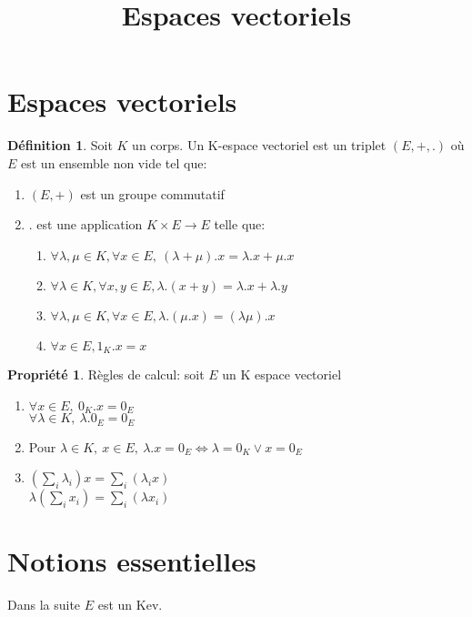 \documentclass[fleqn]{article}
\title{Espaces vectoriels}
\date{}
\theoremstyle{definition} \newtheorem*{defi}{D\'efinition}
\theoremstyle{definition} \newtheorem*{theo}{Th\'eor\`eme}
\theoremstyle{definition} \newtheorem*{coro}{Corollaire}
\theoremstyle{definition} \newtheorem*{nota}{Notation}
\theoremstyle{remark} \newtheorem*{rqs}{Remarques}
\theoremstyle{definition} \newtheorem*{prop}{Propri\'et\'e}
\begin{document}
\maketitle

\section{Espaces vectoriels}
\begin{defi}
	Soit $K$ un corps. Un K-espace vectoriel est un triplet $(E, + ,.)$ o\`u $E$ est un ensemble non vide tel que:
	\begin{enumerate}
		\item $(E,+)$ est un groupe commutatif
		\item $.$ est une application $K \times E \rightarrow E$ telle que:
		\begin{enumerate}
			\item $\forall \lambda, \mu \in K, \forall x \in E,\ (\lambda + \mu).x = \lambda . x + \mu . x$
			\item $\forall \lambda \in K, \forall x,y \in E, \lambda . (x+y) = \lambda . x + \lambda . y$
			\item $\forall \lambda, \mu \in K, \forall x \in E, \lambda . (\mu . x) = (\lambda \mu). x$
			\item $\forall x \in E, 1_K . x = x$
		\end{enumerate}
	\end{enumerate}
\end{defi}

\begin{prop} R\`egles de calcul: soit $E$ un K espace vectoriel
	\begin{enumerate}
		\item $\forall x \in E,\ 0_K . x = 0_E$\\
			$\forall \lambda \in K,\ \lambda . 0_E = 0_E$
		\item Pour $\lambda \in K,\ x \in E,\ \lambda . x = 0_E \Leftrightarrow \lambda = 0_K \lor x = 0_E$
		\item $\left( \sum_i \lambda_i \right) x = \sum_i \left(\lambda_i x \right)$\\
			$\lambda \left( \sum_i x_i \right) = \sum_i \left(\lambda x_i \right)$
	\end{enumerate}
\end{prop}

\section{Notions essentielles}
Dans la suite $E$ est un Kev.
\end{document}
